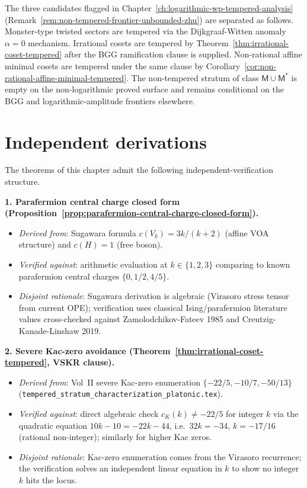\begin{remark}
\label{rem:three-candidate-frontier-closure}
The three candidates flagged in
Chapter~\ref{ch:logarithmic-wp-tempered-analysis}
(Remark~\ref{rem:non-tempered-frontier-unbounded-zhu}) are separated
as follows. Monster-type twisted sectors are tempered via the
Dijkgraaf-Witten anomaly $\alpha = 0$ mechanism. Irrational cosets
are tempered by Theorem~\ref{thm:irrational-coset-tempered} after the
BGG ramification clause is supplied. Non-rational affine minimal cosets
are tempered under the same clause by
Corollary~\ref{cor:non-rational-affine-minimal-tempered}. The
non-tempered stratum of class $\mathsf{M} \cup \mathsf{M}^*$ is empty
on the non-logarithmic proved surface and remains conditional on the
BGG and logarithmic-amplitude frontiers elsewhere.
\end{remark}

\section{Independent derivations}
\label{sec:irrational-cosets-iv-summary}

The theorems of this chapter admit the following
independent-verification structure.

\textbf{1. Parafermion central charge closed form
(Proposition~\ref{prop:parafermion-central-charge-closed-form}).}
\begin{itemize}[nosep]
\item \emph{Derived from}: Sugawara formula $c(V_k) = 3 k / (k + 2)$
 (affine VOA structure) and $c(H) = 1$ (free boson).
\item \emph{Verified against}: arithmetic evaluation at $k \in \{1,
 2, 3\}$ comparing to known parafermion central charges
 $\{0, 1/2, 4/5\}$.
\item \emph{Disjoint rationale}: Sugawara derivation is algebraic
 (Virasoro stress tensor from current OPE); verification uses
 classical Ising/parafermion literature values cross-checked against
 Zamolodchikov-Fateev 1985 and Creutzig-Kanade-Linshaw 2019.
\end{itemize}

\textbf{2. Severe Kac-zero avoidance
(Theorem~\ref{thm:irrational-coset-tempered}, VSKR clause).}
\begin{itemize}[nosep]
\item \emph{Derived from}: Vol~II severe Kac-zero enumeration $\{-22/5,
 -10/7, -50/13\}$ (\texttt{tempered\_stratum\_characterization\_platonic.tex}).
\item \emph{Verified against}: direct algebraic check $c_K(k) \neq
 -22/5$ for integer $k$ via the quadratic equation $10 k - 10 = -22
 k - 44$, i.e.\ $32 k = -34$, $k = -17/16$ (rational non-integer);
 similarly for higher Kac zeros.
\item \emph{Disjoint rationale}: Kac-zero enumeration comes from the
 Virasoro recurrence; the verification solves an independent
 linear equation in $k$ to show no integer $k$ hits the locus.
\end{itemize}

